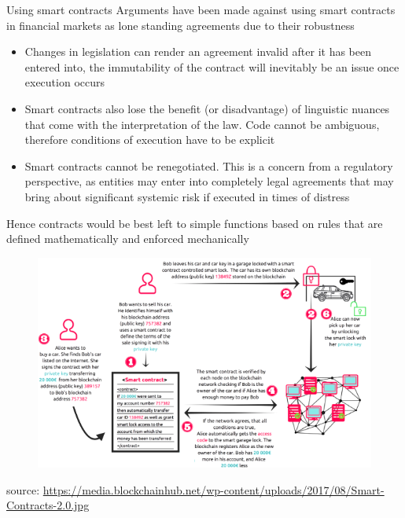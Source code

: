 \documentclass[11pt]{beamer}
\begin{document}


\begin{frame}{Using smart contracts}
	Arguments have been made against using smart contracts in financial markets as lone standing agreements due to their robustness
	\begin{itemize}
		\item Changes in legislation can render an agreement invalid after it has been entered into, the immutability of the contract will inevitably be an issue once execution occurs
		\item Smart contracts also lose the benefit (or disadvantage) of linguistic nuances that come with the interpretation of the law. Code cannot be ambiguous, therefore conditions of execution have to be explicit
		\item Smart contracts cannot be renegotiated. This is a concern from a regulatory perspective, as entities may enter into completely legal agreements that may bring about significant systemic risk if executed in times of distress
	\end{itemize}
	Hence contracts would be best left to simple functions based on rules that are defined mathematically and enforced mechanically
\end{frame}





\begin{frame}
	\begin{figure}[]
		\centering
		\includegraphics  [scale=0.5]{Images/smart4}
	\end{figure}
	\begin{scriptsize}
		source: \href{https://blockchainhub.net/blog/infographics/smart-contracts-explained/}{https://media.blockchainhub.net/wp-content/uploads/2017/08/Smart-Contracts-2.0.jpg}
	\end{scriptsize}
\end{frame}
\end{document}
